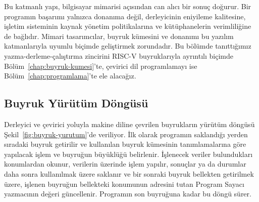 Bu katmanlı yapı, bilgisayar mimarisi açısından can alıcı bir sonuç doğurur. Bir programın başarımı yalnızca donanıma değil, derleyicinin eniyileme kalitesine, işletim sisteminin kaynak yönetim politikalarına ve kütüphanelerin verimliliğine de bağlıdır. Mimari tasarımcılar, buyruk kümesini ve donanımı bu yazılım katmanlarıyla uyumlu biçimde geliştirmek zorundadır. Bu bölümde tanıttığımız yazma-derleme-çalıştırma zincirini RISC-V buyruklarıyla ayrıntılı biçimde Bölüm~\ref{chap:buyruk-kumesi}'te, çevirici dil programlamayı ise Bölüm~\ref{chap:programlama}'te ele alacağız.

\subsection{Buyruk Yürütüm Döngüsü}
\label{subsec:buyruk-yurutum-dongusu}

Derleyici ve çevirici yoluyla makine diline çevrilen buyrukların yürütüm döngüsü Şekil~\ref{fig:buyruk-yurutum}'de veriliyor. İlk olarak programın saklandığı yerden sıradaki buyruk getirilir ve kullanılan buyruk kümesinin tanımlamalarına göre yapılacak işlem ve buyruğun büyüklüğü belirlenir. İşlenecek veriler bulundukları konumlardan okunur, verilerin üzerinde işlem yapılır, sonuçlar ya da durumlar daha sonra kullanılmak üzere saklanır ve bir sonraki buyruk bellekten getirilmek üzere, işlenen buyruğun bellekteki konumunun adresini tutan Program Sayacı yazmacının değeri güncellenir. Programın son buyruğuna kadar bu döngü sürer.

